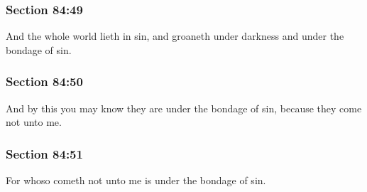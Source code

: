 	\subsubsection{Section 84:49} %
		\label{DC84-49}

		And the whole world lieth in sin, and groaneth under darkness and under the bondage of sin.


	\subsubsection{Section 84:50} %
		\label{DC84-50}

		And by this you may know they are under the bondage of sin, because they come not unto me.


	\subsubsection{Section 84:51} %
		\label{DC84-51}

		For whoso cometh not unto me is under the bondage of sin.


